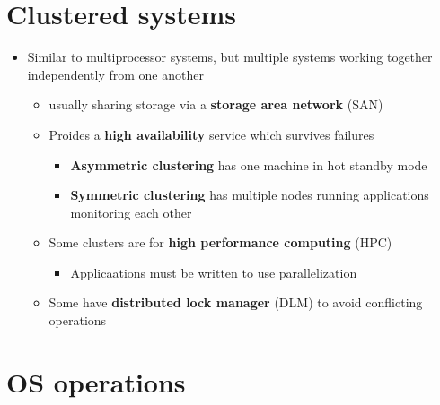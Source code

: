 \documentclass[12pt]{book}
\begin{document}
\section*{Clustered systems}

\begin{itemize}
    \item Similar to multiprocessor systems, but multiple systems working together independently from one another
    \begin{itemize}
        \item usually sharing storage via a \textbf{storage area network} (SAN)
        \item Proides a \textbf{high availability} service which survives failures
        \begin{itemize}
            \item \textbf{Asymmetric clustering} has one machine in hot standby mode
            \item \textbf{Symmetric clustering} has multiple nodes running applications monitoring each other
        \end{itemize}

        \item Some clusters are for \textbf{high performance computing} (HPC)
        \begin{itemize}
            \item Applicaations must be written to use parallelization
        \end{itemize}

        \item Some have \textbf{distributed lock manager} (DLM) to avoid conflicting operations
    \end{itemize}
\end{itemize}

\section*{OS operations}
\end{document}

